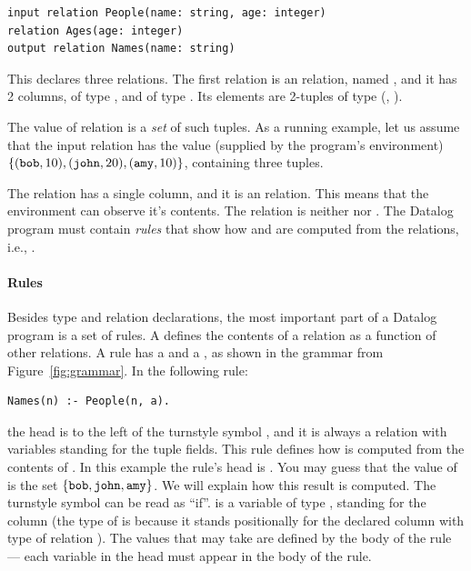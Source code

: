 \begin{lstlisting}[language=ddlog]
input relation People(name: string, age: integer)
relation Ages(age: integer)
output relation Names(name: string)
\end{lstlisting}

This declares three relations.  The first relation is an  relation, named ,
and it has 2 columns,  of type , and  of type .
Its elements are 2-tuples of type (, ).

The value of relation  is a \emph{set} of such tuples.  As a running example,
let us assume that the input relation  has the value (supplied by the
program's environment) $\{ (\mbox{\texttt{bob}}, 10),
(\mbox{\texttt{john}}, 20), (\mbox{\texttt{amy}}, 10) \}$, containing three tuples.

The relation  has a single column, and it is an  relation.
This means that the environment can observe it's contents.  The relation 
is neither  nor .  The Datalog program must contain
\emph{rules} that show how  and  are
computed from the  relations, i.e., .

\paragraph{Rules}

Besides type and relation declarations, the most important part of a Datalog program is a set of rules.
A  defines the contents of a relation as a function
of other relations.  A rule has a  and a , as shown in the
grammar from Figure~\ref{fig:grammar}.  In the following rule:

\noindent
\begin{lstlisting}[language=ddlog]
Names(n) :- People(n, a).
\end{lstlisting}

\noindent the head is to the left of the turnstyle symbol \code{:-},
and it is always a relation with variables standing for the tuple fields.
This rule defines how  is computed from the contents
of .
In this example the rule's head is .
You may guess that the value of  is the set
$\{ \mbox{\texttt{bob}}, \mbox{\texttt{john}}, \mbox{\texttt{amy}} \}$.  We will explain how this result is computed.
The turnstyle symbol can be read as ``if''.
 is a variable of type , standing for the column 
(the type of  is  because it stands positionally for the declared
column  with type  of relation ).
The values that  may take are defined by the body of the rule
--- each variable in the head must appear in the body of the rule.

